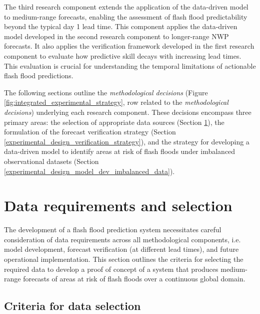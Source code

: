 The  third research component extends the application of the data-driven model to medium-range forecasts, enabling the assessment of flash flood predictability beyond the typical day 1 lead time. This component applies the data-driven model developed in the second research component to longer-range NWP forecasts. It also applies the verification framework developed in the first research component to evaluate how predictive skill decays with increasing lead times. This evaluation is crucial for understanding the temporal limitations of actionable flash flood predictions.

The following sections outline the \textit{methodological decisions} (Figure \ref{fig:integrated_experimental_strategy}, row related to the \textit{methodological decisions}) underlying each research component. These decisions encompass three primary areas: the selection of appropriate data sources (Section \ref{experimental_data_requirements}), the formulation of the forecast verification strategy (Section \ref{experimental_design_verification_strategy}), and the strategy for developing a data-driven model to identify areas at risk of flash floods under imbalanced observational datasets (Section \ref{experimental_design_model_dev_imbalanced_data}). 

\section{Data requirements and selection}
\label{experimental_data_requirements}

The development of a flash flood prediction system necessitates careful consideration of data requirements across all methodological components, i.e. model development, forecast verification (at different lead times), and future operational implementation. This section outlines the criteria for selecting the required data to develop a proof of concept of a system that produces medium-range forecasts of areas at risk of flash floods over a continuous global domain. 

\subsection{Criteria for data selection}

